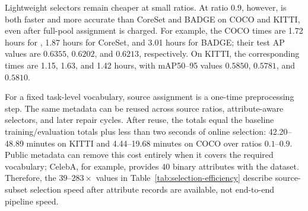 Lightweight selectors remain cheaper at small ratios. At ratio $0.9$, however, \model is both faster and more accurate than CoreSet and BADGE on COCO and KITTI, even after full-pool assignment is charged. For example, the COCO times are 1.72 hours for \model, 1.87 hours for CoreSet, and 3.01 hours for BADGE; their test AP values are $0.6355$, $0.6202$, and $0.6213$, respectively. On KITTI, the corresponding times are 1.15, 1.63, and 1.42 hours, with mAP50--95 values $0.5850$, $0.5781$, and $0.5810$.

For a fixed task-level vocabulary, source assignment is a one-time preprocessing step. The same metadata can be reused across source ratios, attribute-aware selectors, and later repair cycles. After reuse, the \model totals equal the baseline training/evaluation totals plus less than two seconds of online selection: 42.20--48.89 minutes on KITTI and 4.44--19.68 minutes on COCO over ratios $0.1$--$0.9$. Public metadata can remove this cost entirely when it covers the required vocabulary; CelebA, for example, provides 40 binary attributes with the dataset. Therefore, the $39$--$283\times$ values in Table~\ref{tab:selection-efficiency} describe source-subset selection speed after attribute records are available, not end-to-end pipeline speed.
